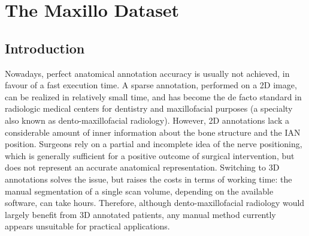 
\chapter{The Maxillo Dataset}

\label{chp:maxillo}

\def\:{\hskip0pt} %

\section{Introduction}
Nowadays, perfect anatomical annotation accuracy is usually not achieved, in
favour of a fast execution time. A sparse annotation, performed on a 2D image,
can be realized in relatively small time, and has become the de facto standard
in radiologic medical centers for dentistry and maxillofacial purposes (a
specialty also known as dento-maxillofacial radiology). However, 2D annotations
lack a considerable amount of inner information about the bone structure and the
IAN position. Surgeons rely on a partial and incomplete idea of the nerve
positioning, which is generally sufficient for a positive outcome of surgical
intervention, but does not represent an accurate anatomical representation.
Switching to 3D annotations solves the issue, but raises the costs in terms of
working time: the manual segmentation of a single scan volume, depending on the
available software, can take hours. Therefore, although dento-maxillofacial
radiology would largely benefit from 3D annotated patients, any manual method
currently appears unsuitable for practical applications.

